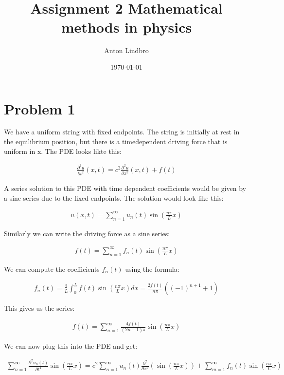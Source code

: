 \documentclass[a4paper]{article}
\title{Assignment 2 Mathematical methods in physics}
\author{Anton Lindbro}
\date{\today}
\begin{document}
\maketitle

\section*{Problem 1}

We have a uniform string  with fixed endpoints. The string is initially at rest in the equilibrium position, but there is a timedependent driving force that is uniform in x. The PDE looks likte this:

\begin{align*}
    \frac{\partial^2 u }{\partial t^2}(x,t) = c^2 \frac{\partial^2 u}{\partial x^2}(x,t) + f(t)
\end{align*}

A series solution to this PDE with time dependent coefficients would be given by a sine series due to the fixed endpoints. The solution would look like this:

\begin{align*}
    u(x,t) = \sum_{n=1}^{\infty} u_n(t) \sin \left(\frac{n \pi}{L}x \right)
\end{align*}

Similarly we can write the driving force as a sine series:

\begin{align*}
    f(t) = \sum_{n=1}^{\infty} f_n(t) \sin \left(\frac{n \pi}{L}x \right)
\end{align*}

We can compute the coefficients $f_n(t)$ using the formula:

\begin{align*}
    f_n(t) = \frac{2}{L} \int_0^L f(t) \sin \left(\frac{n \pi}{L}x \right) dx = \frac{2f(t)}{n \pi} ((-1)^{n+1} + 1)
\end{align*}

This gives us the series:

\begin{align*}
    f(t) = \sum_{n=1}^{\infty} \frac{4f(t)}{(2n-1) \pi} \sin \left(\frac{n \pi}{L}x \right)
\end{align*}

We can now plug this into the PDE and get:

\begin{align*}
    \sum_{n=1}^{\infty} \frac{\partial^2 u_n(t)}{\partial t^2} \sin \left(\frac{n \pi}{L}x \right) = c^2 \sum_{n=1}^{\infty} u_n(t) \frac{\partial^2}{\partial x^2}\left( \sin \left(\frac{n \pi}{L}x \right) \right) + \sum_{m=1}^{\infty} f_n(t) \sin \left(\frac{n \pi}{L}x \right)
\end{align*}
\end{document}
